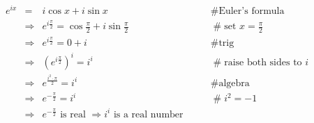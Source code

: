\documentclass[11pt, oneside]{article}   	%
\begin{document}
    
\begin{equation*}
\begin{array}{lllll}
e^{ix}
&=& i \cos x + i \sin x                                                                                    &\qquad  \mathrel{\#} \text{Euler's formula}           \\ 
&\Rightarrow& e^{i \frac{\pi}{2}}  = \cos \frac{\pi}{2} + i \sin \frac{\pi}{2}       &\qquad  \mathrel{\#} \text{set $x = \frac{\pi}{2}$}  \\
&\Rightarrow& e^{i \frac{\pi}{2}}  = 0 +  i                                                      &\qquad  \mathrel{\#} \text{trig}                               \\
&\Rightarrow& (e^{i \frac{\pi}{2}})^i =  i^i                                                      &\qquad  \mathrel{\#} \text{raise both sides to $i$}  \\
&\Rightarrow& e^{\frac{i^2 \cdot \pi}{2}} =  i^i                                              &\qquad  \mathrel{\#} \text{algebra}                         \\
&\Rightarrow& e^{- \frac {\pi}{2}} =  i^i                                                         &\qquad  \mathrel{\#} i^2 = -1                                   \\
&\Rightarrow& e^{- \frac {\pi}{2}} \text{ is real $\Rightarrow i^i$ is a real number}
                                                        
                                                        
                                                      
\end{array}
\end{equation*}
\end{document}

